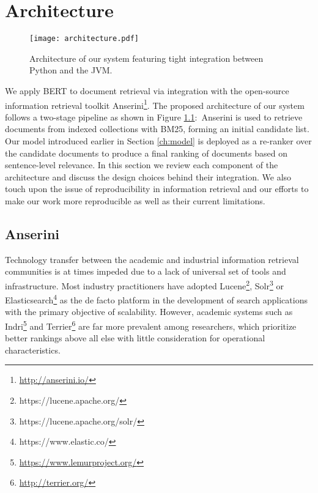 \chapter{Architecture}
\label{ch:arch}

\begin{figure}[b!]
\centering
  \texttt{[image: architecture.pdf]}
\caption{Architecture of our system featuring tight integration between Python and the JVM.}
\label{fig:arch}
\end{figure}

We apply BERT to document retrieval via integration with the open-source information retrieval toolkit Anserini\footnote{\url{http://anserini.io/}}.
The proposed architecture of our system follows a two-stage pipeline as shown in Figure \ref{fig:arch}:\
Anserini is used to retrieve documents from indexed collections with BM25, forming an initial candidate list.
Our model introduced earlier in Section \ref{ch:model} is deployed as a re-ranker over the candidate documents to produce a final ranking of documents based on sentence-level relevance.
In this section we review each component of the architecture and discuss the design choices behind their integration.
We also touch upon the issue of reproducibility in information retrieval and our efforts to make our work more reproducible as well as their current limitations.

\section{Anserini}

Technology transfer between the academic and industrial information retrieval communities is at times impeded due to a lack of universal set of tools and infrastructure.
Most industry practitioners have adopted Lucene\footnote{https://lucene.apache.org/}, Solr\footnote{https://lucene.apache.org/solr/} or Elasticsearch\footnote{https://www.elastic.co/} as the de facto platform in the development of search applications with the primary objective of scalability.
However, academic systems such as Indri\footnote{\url{https://www.lemurproject.org/}} and Terrier\footnote{\url{http://terrier.org/}} are far more prevalent among researchers, which prioritize better rankings above all else with little consideration for operational characteristics.

